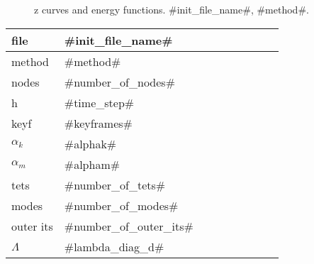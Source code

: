 

\begin{figure}
  \centering
  \caption{z curves and energy functions. #init_file_name#, #method#.}
  \label{en_f}
\end{figure}

\begin{center}
  \begin{tabular}{|l*{8}{|l}}
    \hline
	file & #init_file_name# \\ \hline
	method & #method# \\ \hline
	nodes & #number_of_nodes# \\ \hline
	h & #time_step# \\ \hline
    keyf & #keyframes#\\\hline
	$\alpha_k$ & #alphak# \\ \hline
	$\alpha_m$ & #alpham# \\ \hline
	tets & #number_of_tets# \\ \hline
	modes & #number_of_modes# \\ \hline
    outer its & #number_of_outer_its# \\ \hline
	$\Lambda$ &  #lambda_diag_d# 
  \end{tabular}
\end{center}